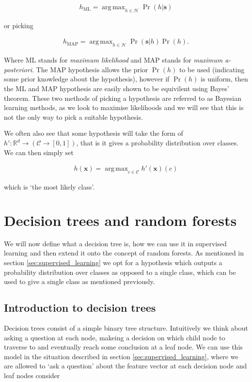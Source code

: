 \documentclass[12pt,twoside,notitlepage]{report}
\newcommand{\vc}[1]{\mathbf{#1}}
\newcommand{\cl}[1]{\mathcal{#1}}
\newcommand{\bb}[1]{\mathbb{#1}}
\DeclareMathOperator*{\argmax}{arg\,max}
\newcommand{\ML}{\text{ML}}
\newcommand{\MAP}{\text{MAP}}
\begin{document}
        \begin{align}
            h_{\ML} = \argmax_{h\in\cl{H}} \Pr(h | \vc{s})
        \end{align}

        or picking

        \begin{align}
            h_{\MAP} = \argmax_{h\in\cl{H}} \Pr(\vc{s} | h) \Pr(h).
        \end{align} 

        Where $\ML$ stands for \textit{maximum likelihood} and $\MAP$ stands for \textit{maximum a-posteriori}. The $\MAP$ 
        hypothesis allows the prior $\Pr(h)$ to be used (indicating some prior knowledge about the hypothesis), however 
        if $\Pr(h)$ is uniform, then the $\ML$ and $\MAP$ hypothesis are easily shown to be equivilent using Bayes' theorem. 
        These two methods of picking a hypothesis are referred to as Bayesian learning methods, as we look to maximise 
        likelihoods and we will see that this is not the only way to pick a suitable hypothesis. \cite{russell1995modern}

        We often also see that some hypothesis will take the form of $h':\bb{R}^d \rightarrow (\cl{C} \rightarrow [0,1])$, 
        that is it gives a probability distribution over classes. We can then simply set 
        
        \begin{align}
            h(\vc{x}) = \argmax_{c\in\cl{C}} h'(\vc{x})(c)
        \end{align}

        which is `the most likely class'.

        



    \section{Decision trees and random forests} \label{sec:rand_forest}
        We will now define what a decision tree is, how we can use it in supervised learning and then extend it onto 
        the concept of random forests. As mentioned in section \ref{sec:supervised_learning} we opt for a hypothesis 
        which outputs a probability distribution over classes as opposed to a single class, which can be used to give 
        a single class as mentioned previously.

        \subsection{Introduction to decision trees} \label{sec:intro_decision_trees}
            Decision trees consist of a simple binary tree structure. Intuitively we think about asking a question at each 
            node, makeing a decision on which child node to traverse to and eventually reach some conclusion at a leaf node. 
            We can use this model in the situation described in section \ref{sec:supervised_learning}, where we are allowed 
            to `ask a question' about the feature vector at each decision node and leaf nodes consider
\end{document}
